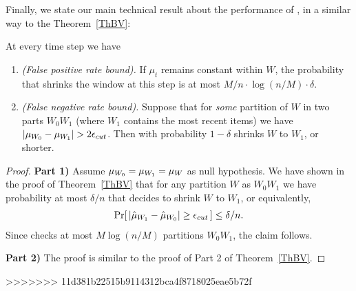 Finally, we state our main technical result about the performance of \adwintwoz, in a similar way to the Theorem~\ref{ThBV}:

\begin{theorem}
\label{ThBV2}
At every time step we have 

\begin{enumerate}
\item {\em (False positive rate bound).} If $\mu_t$ remains constant within $W$, 
the probability that \adwintwo shrinks the window 
at this step is at most $ M/n  \cdot \log (n/M) \cdot \delta$.

\item {\em (False negative rate bound).} 
Suppose that for {\em some} partition of $W$ in two parts $W_0W_1$ 
(where $W_1$ contains the most recent items) 
we have $|\mu_{W_0}-\mu_{W_1}| > 2\epsilon_{cut}$. 
Then with probability $1-\delta$ \adwintwo
shrinks $W$ to $W_1$, or shorter.
\end{enumerate}
\end{theorem}

\begin{proof}

{\bf{Part 1)}}
Assume ${\mu}_{W_0}={\mu}_{W_1}=\mu_W$ as null hypothesis. We have shown in the proof of Theorem~\ref{ThBV} that for any partition
$W$ as $W_0W_1$ we have probability at most $\delta/n$ that \adwinz
decides to shrink $W$ to $W_1$, or equivalently,
\begin{eqnarray*}
\Pr [\, |\hat{\mu}_{W_1} - \hat{\mu}_{W_0}| \ge  \epsilon_{cut}\, ] \le \delta/n.
\end{eqnarray*}
%
Since \adwintwo checks at most  $M \log (n/M)$ partitions $W_0 W_1$, the claim follows.

{\bf{Part 2)}}
The proof is similar to the proof of Part 2 of Theorem~\ref{ThBV}.
\end{proof}
>>>>>>> 11d381b22515b9114312bca4f8718025eae5b72f
